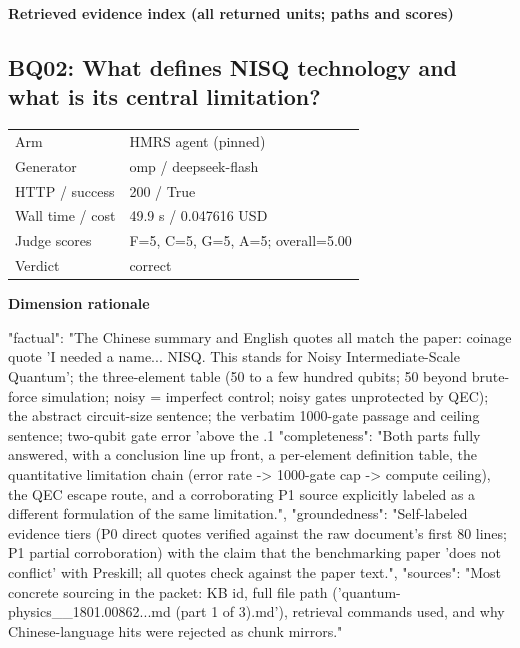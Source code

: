 \documentclass[10pt]{article}
\begin{document}
\textbf{Retrieved evidence index (all returned units; paths and scores) }
\begin{EvidenceText}
\end{EvidenceText}
\subsection{BQ02: What defines NISQ technology and what is its central limitation?}
\begin{tabular}{@{}ll@{}}
Arm & HMRS agent (pinned)\\
Generator & omp / deepseek-flash\\
HTTP / success & 200 / True\\
Wall time / cost & 49.9 s / 0.047616 USD\\
Judge scores & F=5, C=5, G=5, A=5; overall=5.00\\
Verdict & correct\\
\end{tabular}

\textbf{Dimension rationale}
\begin{EvidenceText}
{
  "factual": "The Chinese summary and English quotes all match the paper: coinage quote 'I needed a name... NISQ. This stands for Noisy Intermediate-Scale Quantum'; the three-element table (50 to a few hundred qubits; 50 beyond brute-force simulation; noisy = imperfect control; noisy gates unprotected by QEC); the abstract circuit-size sentence; the verbatim 1000-gate passage and ceiling sentence; two-qubit gate error 'above the .1%
  "completeness": "Both parts fully answered, with a conclusion line up front, a per-element definition table, the quantitative limitation chain (error rate -> 1000-gate cap -> compute ceiling), the QEC escape route, and a corroborating P1 source explicitly labeled as a different formulation of the same limitation.",
  "groundedness": "Self-labeled evidence tiers (P0 direct quotes verified against the raw document's first 80 lines; P1 partial corroboration) with the claim that the benchmarking paper 'does not conflict' with Preskill; all quotes check against the paper text.",
  "sources": "Most concrete sourcing in the packet: KB id, full file path ('quantum-physics__1801.00862...md (part 1 of 3).md'), retrieval commands used, and why Chinese-language hits were rejected as chunk mirrors."
}
\end{EvidenceText}
\end{document}
